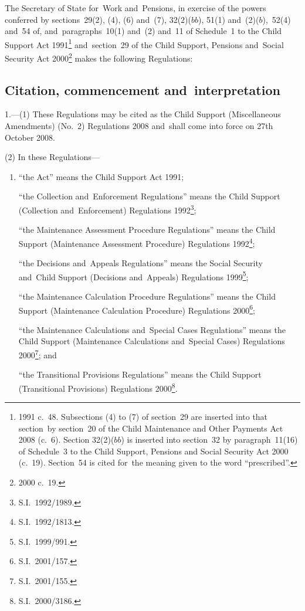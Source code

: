 \documentclass[12pt,a4paper]{article}
\title{\regstitle}
\author{S.I.\ 2008 No.\ 2544}
\date{Made
26th September 2008\\
Laid before Parliament
1st October 2008\\
Coming into force
27th October 2008
}
\begin{document}
\maketitle

\noindent
The Secretary of State for~Work and~Pensions, in exercise of the powers conferred by sections~29(2), (4), (6) and~(7), 32(2)($bb$), 51(1) and~(2)($b$),~52(4) and~54 of, and~paragraphs~10(1) and~(2) and~11 of Schedule~1 to the Child Support Act 1991\footnote{1991 c.~48. Subsections (4) to (7) of section~29 are inserted into that section~by section~20 of the Child Maintenance and Other Payments Act 2008 (c.~6). Section 32(2)($bb$) is inserted into section~32 by paragraph~11(16) of Schedule~3 to the Child Support, Pensions and Social Security Act 2000 (c.~19). Section~54 is cited for~the meaning given to the word “prescribed”.} and~section~29 of the Child Support, Pensions and~Social Security Act 2000\footnote{2000 c.~19.} makes the following Regulations: 

{\sloppy

\tableofcontents

}

\bigskip

\setcounter{secnumdepth}{-2}

\subsection[1. Citation, commencement and~interpretation]{Citation, commencement and~interpretation}

1.---(1)  These Regulations may be cited as the Child Support (Miscellaneous Amendments) (No.~2) Regulations 2008 and~shall come into force on 27th October 2008.

(2) In these Regulations—
\begin{enumerate}\item[]
“the Act” means the Child Support Act 1991;

“the Collection and~Enforcement Regulations” means the Child Support (Collection and~Enforcement) Regulations 1992\footnote{S.I.~1992/1989.};

“the Maintenance Assessment Procedure Regulations” means the Child Support (Maintenance Assessment Procedure) Regulations 1992\footnote{S.I.~1992/1813.};

“the Decisions and~Appeals Regulations” means the Social Security and~Child Support (Decisions and~Appeals) Regulations 1999\footnote{S.I.~1999/991.};

“the Maintenance Calculation Procedure Regulations” means the Child Support (Maintenance Calculation Procedure) Regulations 2000\footnote{S.I.~2001/157.};

“the Maintenance Calculations and~Special Cases Regulations” means the Child Support (Maintenance Calculations and~Special Cases) Regulations 2000\footnote{S.I.~2001/155.}; and

“the Transitional Provisions Regulations” means the Child Support (Transitional Provisions) Regulations 2000\footnote{S.I.~2000/3186.}.
\end{enumerate}
\end{document}
